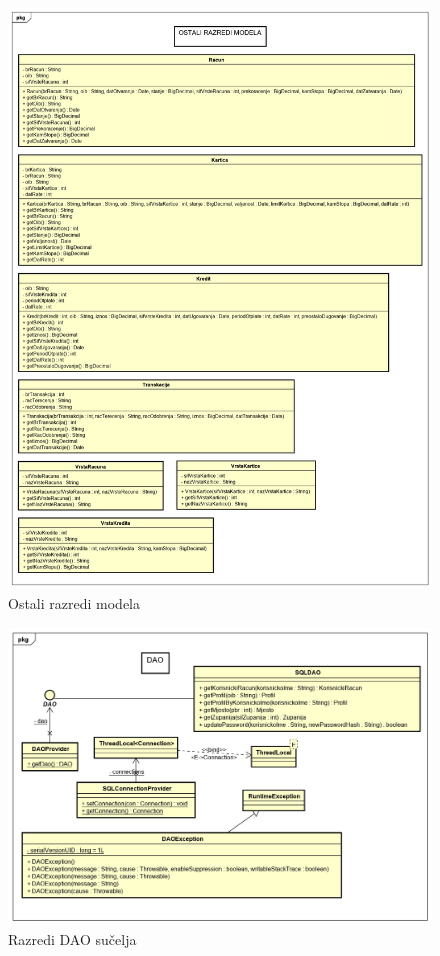 			\begin{figure}[H]
				\includegraphics[scale=0.45]{Slike/Class Diagram1.PNG}
				\centering
				\caption{Ostali razredi modela}
				\label{fig:dijagram}
			\end{figure}
		
			\begin{figure}[H]
				\includegraphics[scale=0.54]{Slike/Class Diagram5.PNG}
				\centering
				\caption{Razredi DAO sučelja}
				\label{fig:dijagram}
			\end{figure}
		
